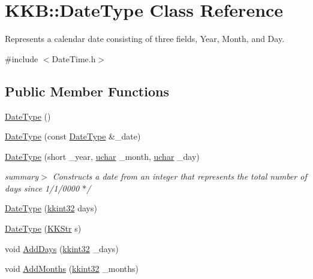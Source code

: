 \hypertarget{class_k_k_b_1_1_date_type}{}\section{K\+KB\+:\+:Date\+Type Class Reference}
\label{class_k_k_b_1_1_date_type}


Represents a calendar date consisting of three fields, Year, Month, and Day.  




{\ttfamily \#include $<$Date\+Time.\+h$>$}

\subsection*{Public Member Functions}
\begin{DoxyCompactItemize}
\item 
\hyperlink{class_k_k_b_1_1_date_type_a3342828a25e5cccef5becfe3bb70a332}{Date\+Type} ()
\item 
\hyperlink{class_k_k_b_1_1_date_type_acf3facfb04092592099677dcc8dbd8d3}{Date\+Type} (const \hyperlink{class_k_k_b_1_1_date_type}{Date\+Type} \&\+\_\+date)
\item 
\hyperlink{class_k_k_b_1_1_date_type_a22e1a1918492f05add36fa4efde14c15}{Date\+Type} (short \+\_\+year, \hyperlink{namespace_k_k_b_ace9969169bf514f9ee6185186949cdf7}{uchar} \+\_\+month, \hyperlink{namespace_k_k_b_ace9969169bf514f9ee6185186949cdf7}{uchar} \+\_\+day)
\begin{DoxyCompactList}\small\item\em summary$>$ Constructs a date from an integer that represents the total number of days since 1/1/0000 $\ast$/ \end{DoxyCompactList}\item 
\hyperlink{class_k_k_b_1_1_date_type_ac0e3a85ac3035024b5dc5ad254c160d6}{Date\+Type} (\hyperlink{namespace_k_k_b_a8fa4952cc84fda1de4bec1fbdd8d5b1b}{kkint32} days)
\item 
\hyperlink{class_k_k_b_1_1_date_type_ae9c9e6817b6378d3ade615ea8e6aca6a}{Date\+Type} (\hyperlink{class_k_k_b_1_1_k_k_str}{K\+K\+Str} s)
\item 
void \hyperlink{class_k_k_b_1_1_date_type_a9a57c3c22c9b41ccc65211b824c9f245}{Add\+Days} (\hyperlink{namespace_k_k_b_a8fa4952cc84fda1de4bec1fbdd8d5b1b}{kkint32} \+\_\+days)
\item 
void \hyperlink{class_k_k_b_1_1_date_type_a0762beeb0686ba69fd174a7c1e541f78}{Add\+Months} (\hyperlink{namespace_k_k_b_a8fa4952cc84fda1de4bec1fbdd8d5b1b}{kkint32} \+\_\+months)

\end{DoxyCompactItemize}
